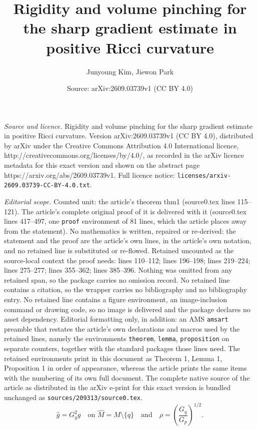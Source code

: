\documentclass[10pt,a4paper]{amsart}
\title{Rigidity and volume pinching for the sharp gradient estimate in positive Ricci curvature}
\author{Junyoung Kim, Jiewon Park}
\date{Source: arXiv:2609.03739v1 (CC BY 4.0)}
\newcommand{\hg}{\widehat{g}}
\newcommand{\hm}{\widehat{M}}
\begin{document}
\maketitle

\noindent\emph{Source and licence.} Rigidity and volume pinching for the sharp gradient estimate in positive Ricci curvature. Version arXiv:2609.03739v1 (CC BY 4.0), distributed by arXiv under the Creative Commons Attribution 4.0 International licence, http://creativecommons.org/licenses/by/4.0/, as recorded in the arXiv licence metadata for this exact version and shown on the abstract page https://arxiv.org/abs/2609.03739v1. Full licence notice: \texttt{licenses/arxiv-2609.03739-CC-BY-4.0.txt}.\par\smallskip

\noindent\textit{Editorial scope.} Counted unit: the article's theorem thm1 (source0.tex lines 115--121). The article's complete original proof of it is delivered with it (source0.tex lines 417--497, one \texttt{proof} environment of 81 lines, which the article places away from the statement). No mathematics is written, repaired or re-derived: the statement and the proof are the article's own lines, in the article's own notation, and no retained line is substituted or re-flowed.  Retained uncounted as the source-local context the proof needs: lines 110--112; lines 196--198; lines 219--224; lines 275--277; lines 355--362; lines 385--396.  Nothing was omitted from any retained span, so the package carries no omission record.  No retained line contains a citation, so the wrapper carries no bibliography and no bibliography entry.  No retained line contains a figure environment, an image-inclusion command or drawing code, so no image is delivered and the package declares no asset dependency.  Editorial formatting only, in addition: an AMS \texttt{amsart} preamble that restates the article's own declarations and macros used by the retained lines, namely the environments \texttt{theorem}, \texttt{lemma}, \texttt{proposition} on separate counters, together with the standard packages those lines need.  The retained environments print in this document as Theorem 1, Lemma 1, Proposition 1 in order of appearance, whereas the article prints the same items with the numbering of its own full document.  The complete native source of the article as distributed in the arXiv e-print for this exact version is bundled unchanged as \texttt{sources/209313/source0.tex}.
\begin{equation}\label{eq:blow-up-data}
\hg=G_q^2g\quad\text{on $\hm=M\setminus\{q\}$}\quad\text{and}\quad \rho=\left(\frac{G_q}{G_p}\right)^{1/2}.
\end{equation}
\end{document}
